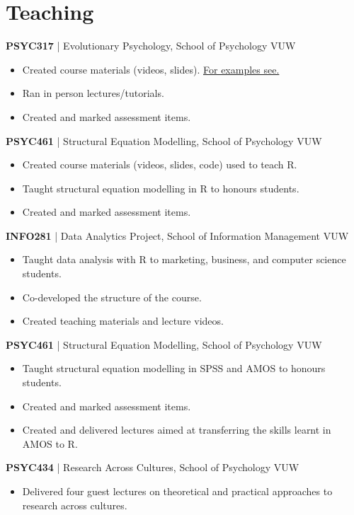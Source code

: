 \documentclass[11pt]{article} %
\begin{document}
\section*{Teaching}


\textbf{PSYC317} | Evolutionary Psychology, School of Psychology VUW
\begin{itemize}
\item Created course materials (videos, slides). \href{https://osf.io/ytnuk/}{ For examples see.}
\item Ran in person lectures/tutorials.
\item Created and marked assessment items. 

\end{itemize}

\textbf{PSYC461} | Structural Equation Modelling, School of Psychology VUW
\begin{itemize}
\item Created course materials (videos, slides, code) used to teach R.
\item Taught structural equation modelling in R to honours students.
\item Created and marked assessment items. 

\end{itemize}


\textbf{INFO281} | Data Analytics Project, School of Information Management VUW
\begin{itemize}
\item Taught data analysis with R to marketing, business, and computer science students. 
\item Co-developed the structure of the course. 
\item Created teaching materials and lecture videos.
\end{itemize}

\textbf{PSYC461} | Structural Equation Modelling, School of Psychology VUW
\begin{itemize}
\item Taught structural equation modelling in SPSS and AMOS to honours students.
\item Created and marked assessment items. 
\item Created and delivered lectures aimed at transferring the skills learnt in AMOS to R.
\end{itemize}

\textbf{PSYC434} | Research Across Cultures, School of Psychology VUW
\begin{itemize}
\item Delivered four guest lectures on theoretical and practical approaches to research across cultures.
\end{itemize}
\end{document}
